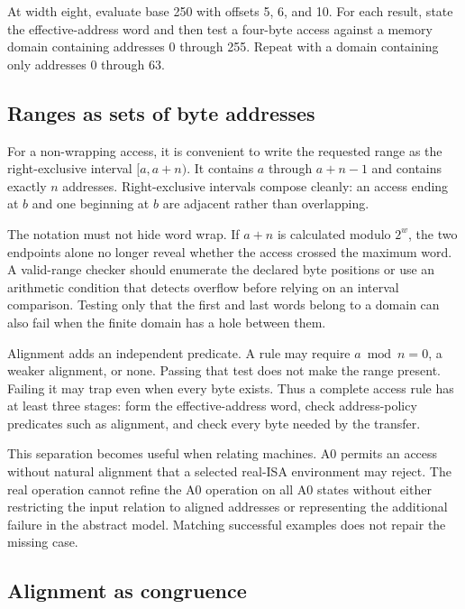 \begin{tryit}[title={Form first, check second}]
At width eight, evaluate base 250 with offsets 5, 6, and 10. For each result,
state the effective-address word and then test a four-byte access against a
memory domain containing addresses 0 through 255. Repeat with a domain
containing only addresses 0 through 63.
\end{tryit}

\subsection{Ranges as sets of byte addresses}

For a non-wrapping access, it is convenient to write the requested range as
the right-exclusive interval \([a,a+n)\). It contains \(a\) through \(a+n-1\)
and contains exactly \(n\) addresses. Right-exclusive intervals compose cleanly: an
access ending at \(b\) and one beginning at \(b\) are adjacent rather than
overlapping.

The notation must not hide word wrap. If \(a+n\) is calculated modulo
\(2^w\), the two endpoints alone no longer reveal whether the access crossed
the maximum word. A valid-range checker should enumerate the declared byte
positions or use an arithmetic condition that detects overflow before relying
on an interval comparison. Testing only that the first and last words belong
to a domain can also fail when the finite domain has a hole between them.

Alignment adds an independent predicate. A rule may require
\(a\bmod n=0\), a weaker alignment, or none. Passing that test does not make
the range present. Failing it may trap even when every byte exists. Thus a
complete access rule has at least three stages: form the effective-address
word, check address-policy predicates such as alignment, and check every byte
needed by the transfer.

This separation becomes useful when relating machines. A0 permits an
access without natural alignment that a selected real-ISA environment may reject. The real
operation cannot refine the A0 operation on all A0 states without either
restricting the input relation to aligned addresses or representing the
additional failure in the abstract model. Matching successful examples does
not repair the missing case.

\subsection{Alignment as congruence}

